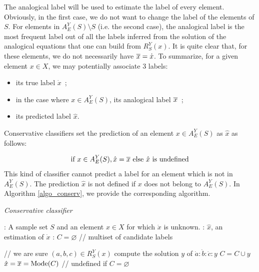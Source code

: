 {The analogical label will be used to estimate the label of every element.
Obviously, in the first case, we do not want to change the label of the
elements of $S$.  For elements in $A_E^Y(S) \setminus S$ (i.e.  the second
case), the analogical label is the most frequent label out of all the labels inferred from the
solution of the analogical equations that one can build from $R_S^Y(x)$.  It is
quite clear that, for these elements,  we do not necessarily have
$\overline{x}=\dot{x}$.  To summarize, for a given element $x \in X$, we may 
potentially associate 3 labels:
\begin{itemize}
\item its true label $\dot{x}$~;
\item in the case where $x \in A_E^Y(S)$, its analogical label $\overline{x}$~;
\item its predicted label $\hat{x}$.
\end{itemize}
\noindent
Conservative classifiers set the prediction of an element $x \in A_E^Y(S)$ as
$\hat{x}$ as follows:

$$\mbox{if } x \in A_E^Y(S),  \hat{x} = \overline{x} \mbox{ else } \hat{x} \mbox{ is undefined}$$
This kind of classifier cannot predict a label for an element which is not in $A_E^Y(S)$.
The prediction $\hat{x}$ is not defined if $x$ does not belong to $A_E^Y(S)$.
In Algorithm \ref{algo_conserv}, we provide the corresponding algorithm.

\begin{algorithm}[!ht]
 \caption{\textit{Conservative classifier}}
       \label{algo_conserv}
       \begin{algorithmic}

      : A sample set $S$ and an element $x \in X$ for which
      $\dot{x}$ is unknown.
      : $\hat{x}$, an estimation of $\dot{x}$
      : $C = \varnothing$ \quad \quad // multiset of candidate labels

      \STATE // we are sure $(a, b, c) \in R_S^Y(x)$
      \STATE compute the solution $y$ of $\dot{a} : \dot{b} : \dot{c} : y$
      \STATE $ C = C \cup y$
      \ENDIF
	    \ENDFOR
      \STATE $\hat{x} = \overline{x}  = \text{Mode} (C)$ // undefined if $C = \varnothing$
\end{algorithmic}
\end{algorithm}

}
